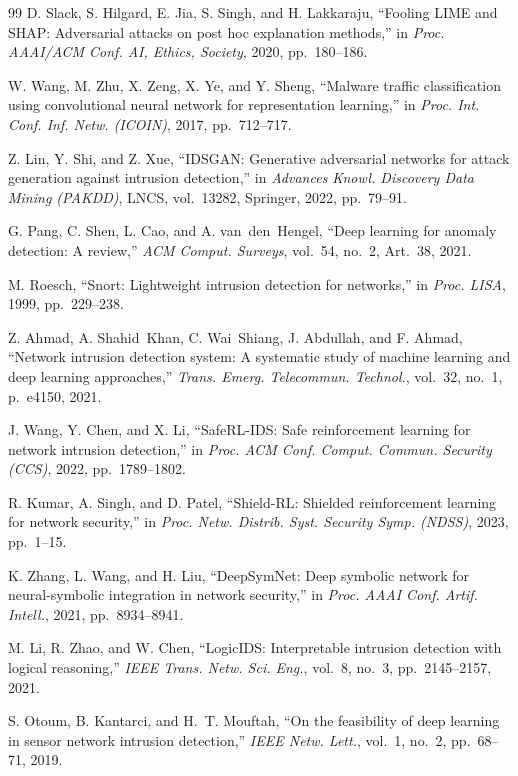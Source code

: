 \documentclass[12pt, letterpaper, oneside]{report}
\begin{document}
\begin{thebibliography}{99}
D. Slack, S. Hilgard, E. Jia, S. Singh, and H. Lakkaraju, ``Fooling LIME and SHAP: Adversarial attacks on post hoc explanation methods,'' in \textit{Proc. AAAI/ACM Conf. AI, Ethics, Society}, 2020, pp.~180--186.

W. Wang, M. Zhu, X. Zeng, X. Ye, and Y. Sheng, ``Malware traffic classification using convolutional neural network for representation learning,'' in \textit{Proc. Int. Conf. Inf. Netw. (ICOIN)}, 2017, pp.~712--717.

Z. Lin, Y. Shi, and Z. Xue, ``IDSGAN: Generative adversarial networks for attack generation against intrusion detection,'' in \textit{Advances Knowl. Discovery Data Mining (PAKDD)}, LNCS, vol.~13282, Springer, 2022, pp.~79--91.

G. Pang, C. Shen, L. Cao, and A. van~den~Hengel, ``Deep learning for anomaly detection: A review,'' \textit{ACM Comput. Surveys}, vol.~54, no.~2, Art.~38, 2021.

M. Roesch, ``Snort: Lightweight intrusion detection for networks,'' in \textit{Proc. LISA}, 1999, pp.~229--238.

Z. Ahmad, A. Shahid~Khan, C. Wai~Shiang, J. Abdullah, and F. Ahmad, ``Network intrusion detection system: A systematic study of machine learning and deep learning approaches,'' \textit{Trans. Emerg. Telecommun. Technol.}, vol.~32, no.~1, p.~e4150, 2021.

J. Wang, Y. Chen, and X. Li, ``SafeRL-IDS: Safe reinforcement learning for network intrusion detection,'' in \textit{Proc. ACM Conf. Comput. Commun. Security (CCS)}, 2022, pp.~1789--1802.

R. Kumar, A. Singh, and D. Patel, ``Shield-RL: Shielded reinforcement learning for network security,'' in \textit{Proc. Netw. Distrib. Syst. Security Symp. (NDSS)}, 2023, pp.~1--15.

K. Zhang, L. Wang, and H. Liu, ``DeepSymNet: Deep symbolic network for neural-symbolic integration in network security,'' in \textit{Proc. AAAI Conf. Artif. Intell.}, 2021, pp.~8934--8941.

M. Li, R. Zhao, and W. Chen, ``LogicIDS: Interpretable intrusion detection with logical reasoning,'' \textit{IEEE Trans. Netw. Sci. Eng.}, vol.~8, no.~3, pp.~2145--2157, 2021.

S. Otoum, B. Kantarci, and H.~T. Mouftah, ``On the feasibility of deep learning in sensor network intrusion detection,'' \textit{IEEE Netw. Lett.}, vol.~1, no.~2, pp.~68--71, 2019.


\end{thebibliography}
\end{document}
